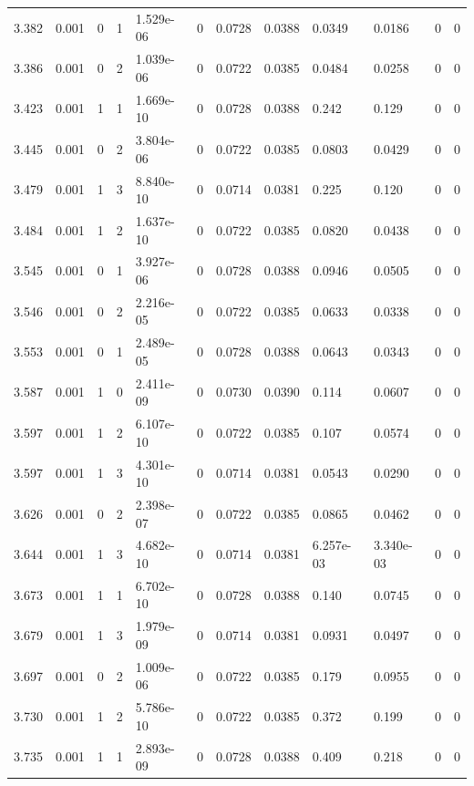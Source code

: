 \documentclass[preview]{standalone}
\begin{document}
{{{{{\begin{tabular}{L{1.2cm}C{1.2cm} C{0.3cm}C{0.5cm} C{1.4cm}C{1.4cm} C{1.4cm}C{1.4cm} C{1.6cm}C{1.6cm} C{1.6cm}C{1.6cm}}
  3.382  &  0.001  & 0     &  1 &  1.529e-06  & 0  &  0.0728&   0.0388& 0.0349 & 0.0186   &  0 & 0  \\ 
  3.386  &  0.001  & 0     &  2 &  1.039e-06  & 0  &  0.0722&   0.0385& 0.0484 & 0.0258   &  0 & 0  \\ 
  3.423  &  0.001  & 1     &  1 &  1.669e-10  & 0  &  0.0728&   0.0388& 0.242 & 0.129   &  0 & 0  \\ 
  3.445  &  0.001  & 0     &  2 &  3.804e-06  & 0  &  0.0722&   0.0385& 0.0803 & 0.0429   &  0 & 0  \\ 
  3.479  &  0.001  & 1     &  3 &  8.840e-10  & 0  &  0.0714&   0.0381& 0.225 & 0.120   &  0 & 0  \\ 
  3.484  &  0.001  & 1     &  2 &  1.637e-10  & 0  &  0.0722&   0.0385& 0.0820 & 0.0438   &  0 & 0  \\ 
  3.545  &  0.001  & 0     &  1 &  3.927e-06  & 0  &  0.0728&   0.0388& 0.0946 & 0.0505   &  0 & 0  \\ 
  3.546  &  0.001  & 0     &  2 &  2.216e-05  & 0  &  0.0722&   0.0385& 0.0633 & 0.0338   &  0 & 0  \\ 
  3.553  &  0.001  & 0     &  1 &  2.489e-05  & 0  &  0.0728&   0.0388& 0.0643 & 0.0343   &  0 & 0  \\ 
  3.587  &  0.001  & 1     &  0 &  2.411e-09  & 0  &  0.0730&   0.0390& 0.114 & 0.0607   &  0 & 0  \\ 
  3.597  &  0.001  & 1     &  2 &  6.107e-10  & 0  &  0.0722&   0.0385& 0.107 & 0.0574   &  0 & 0  \\ 
  3.597  &  0.001  & 1     &  3 &  4.301e-10  & 0  &  0.0714&   0.0381& 0.0543 & 0.0290   &  0 & 0  \\ 
  3.626  &  0.001  & 0     &  2 &  2.398e-07  & 0  &  0.0722&   0.0385& 0.0865 & 0.0462   &  0 & 0  \\ 
  3.644  &  0.001  & 1     &  3 &  4.682e-10  & 0  &  0.0714&   0.0381& 6.257e-03 & 3.340e-03   &  0 & 0  \\ 
  3.673  &  0.001  & 1     &  1 &  6.702e-10  & 0  &  0.0728&   0.0388& 0.140 & 0.0745   &  0 & 0  \\ 
  3.679  &  0.001  & 1     &  3 &  1.979e-09  & 0  &  0.0714&   0.0381& 0.0931 & 0.0497   &  0 & 0  \\ 
  3.697  &  0.001  & 0     &  2 &  1.009e-06  & 0  &  0.0722&   0.0385& 0.179 & 0.0955   &  0 & 0  \\ 
  3.730  &  0.001  & 1     &  2 &  5.786e-10  & 0  &  0.0722&   0.0385& 0.372 & 0.199   &  0 & 0  \\ 
  3.735  &  0.001  & 1     &  1 &  2.893e-09  & 0  &  0.0728&   0.0388& 0.409 & 0.218   &  0 & 0  \\ 

\end{tabular}}}}}}
\end{document}
